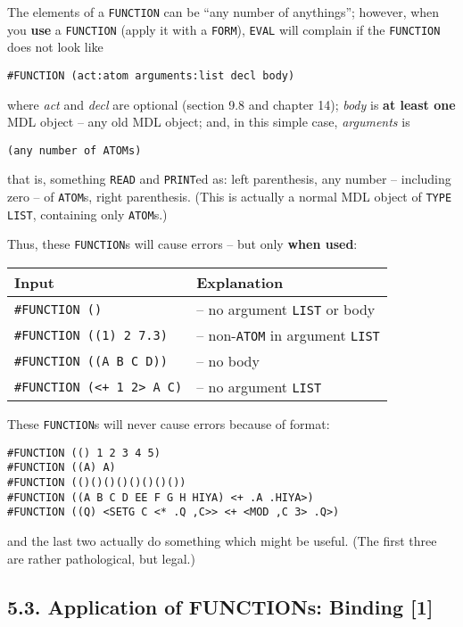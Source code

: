 \documentclass[a4paper,]{article}
\begin{document}
The elements of a \texttt{FUNCTION} can be ``any number of anythings''; however, when you \textbf{use} a \texttt{FUNCTION}
(apply it with a \texttt{FORM}), \texttt{EVAL} will complain if the \texttt{FUNCTION} does not look like

\begin{verbatim}
#FUNCTION (act:atom arguments:list decl body)
\end{verbatim}

where \emph{act} and \emph{decl} are optional (section 9.8 and chapter 14); \emph{body} is \textbf{at least one} MDL object
-- any old MDL object; and, in this simple case, \emph{arguments} is

\begin{verbatim}
(any number of ATOMs)
\end{verbatim}

that is, something \texttt{READ} and \texttt{PRINT}ed as: left parenthesis, any number -- including zero -- of
\texttt{ATOM}s, right parenthesis. (This is actually a normal MDL object of \texttt{TYPE} \texttt{LIST}, containing only
\texttt{ATOM}s.)

Thus, these \texttt{FUNCTION}s will cause errors -- but only \textbf{when used}:

\begin{longtable}[]{@{}ll@{}}
\toprule
Input & Explanation\tabularnewline
\midrule
\endhead
\texttt{\#FUNCTION\ ()} & -- no argument \texttt{LIST} or body\tabularnewline
\texttt{\#FUNCTION\ ((1)\ 2\ 7.3)} & -- non-\texttt{ATOM} in argument \texttt{LIST}\tabularnewline
\texttt{\#FUNCTION\ ((A\ B\ C\ D))} & -- no body\tabularnewline
\texttt{\#FUNCTION\ (\textless{}+\ 1\ 2\textgreater{}\ A\ C)} & -- no argument \texttt{LIST}\tabularnewline
\bottomrule
\end{longtable}

These \texttt{FUNCTION}s will never cause errors because of format:

\begin{verbatim}
#FUNCTION (() 1 2 3 4 5)
#FUNCTION ((A) A)
#FUNCTION (()()()()()()()())
#FUNCTION ((A B C D EE F G H HIYA) <+ .A .HIYA>)
#FUNCTION ((Q) <SETG C <* .Q ,C>> <+ <MOD ,C 3> .Q>)
\end{verbatim}

and the last two actually do something which might be useful. (The first three are rather pathological, but legal.)

\subsection{5.3. Application of FUNCTIONs: Binding {[}1{]}}\label{application-of-functions-binding-1}
\end{document}
